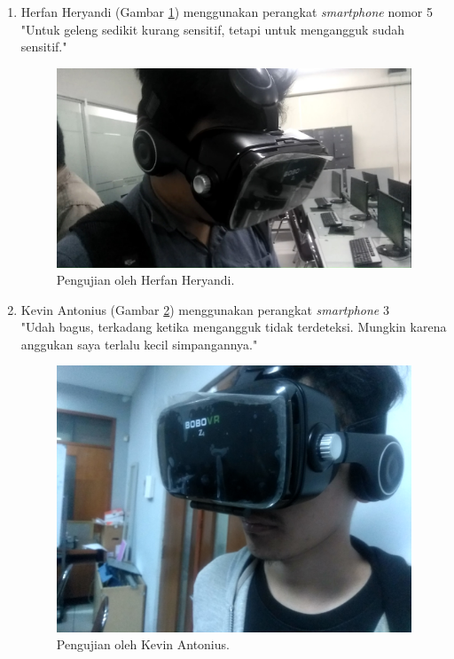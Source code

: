 \begin{enumerate}
    \item Herfan Heryandi (Gambar \ref{fig:pengujian_herfan_heryandi}) menggunakan perangkat \textit{smartphone} nomor 5\\
    "Untuk geleng sedikit kurang sensitif, tetapi untuk mengangguk sudah sensitif."

    \begin{figure}[htbp]
    \centering
    \includegraphics[scale=0.35]{Gambar/PengujianEksperimental/HerfanHeryandi.jpg}
    \caption{Pengujian oleh Herfan Heryandi.} 
    \label{fig:pengujian_herfan_heryandi}
    \end{figure}
    
    \item Kevin Antonius (Gambar \ref{fig:pengujian_kevin_antonius}) menggunakan perangkat \textit{smartphone} 3\\
    
    "Udah bagus, terkadang ketika mengangguk tidak terdeteksi. Mungkin karena anggukan saya terlalu kecil simpangannya."
    
    \begin{figure}[htbp]
    \centering
    \includegraphics[scale=0.07]{Gambar/PengujianEksperimental/KevinAntonius.jpg}
    \caption{Pengujian oleh Kevin Antonius.} 
    \label{fig:pengujian_kevin_antonius}
    \end{figure}
    

\end{enumerate}
